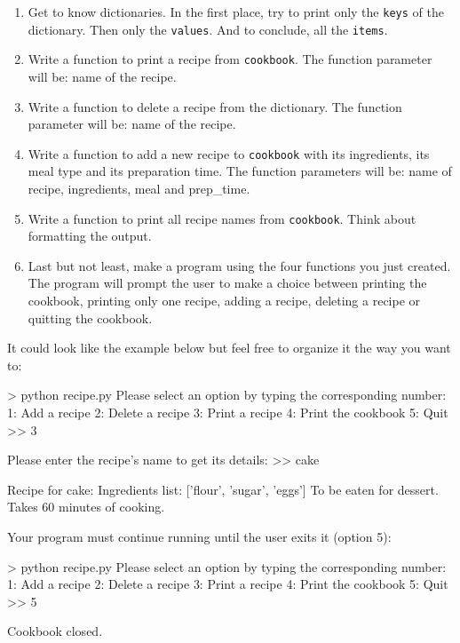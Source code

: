 \documentclass[]{article}
\newenvironment{Shaded}{\begin{snugshade}}{\end{snugshade}}
\newcommand{\NormalTok}[1]{\textcolor[rgb]{0.81,0.81,0.76}{#1}}
\begin{document}
\begin{enumerate}
\def\labelenumi{\arabic{enumi}.}
\item
  Get to know dictionaries. In the first place, try to print only the
  \texttt{keys} of the dictionary. Then only the \texttt{values}. And to
  conclude, all the \texttt{items}.
\item
  Write a function to print a recipe from \texttt{cookbook}. The
  function parameter will be: name of the recipe.
\item
  Write a function to delete a recipe from the dictionary. The function
  parameter will be: name of the recipe.
\item
  Write a function to add a new recipe to \texttt{cookbook} with its
  ingredients, its meal type and its preparation time. The function
  parameters will be: name of recipe, ingredients, meal and prep\_time.
\item
  Write a function to print all recipe names from \texttt{cookbook}.
  Think about formatting the output.
\item
  Last but not least, make a program using the four functions you just
  created. The program will prompt the user to make a choice between
  printing the cookbook, printing only one recipe, adding a recipe,
  deleting a recipe or quitting the cookbook.
\end{enumerate}

It could look like the example below but feel free to organize it the
way you want to:

\begin{Shaded}
\begin{Highlighting}[]
\NormalTok{> python recipe.py}
\NormalTok{Please select an option by typing the corresponding number:}
\NormalTok{1: Add a recipe}
\NormalTok{2: Delete a recipe}
\NormalTok{3: Print a recipe}
\NormalTok{4: Print the cookbook}
\NormalTok{5: Quit}
\NormalTok{>> 3}

\NormalTok{Please enter the recipe's name to get its details:}
\NormalTok{>> cake}

\NormalTok{Recipe for cake:}
\NormalTok{Ingredients list: ['flour', 'sugar', 'eggs']}
\NormalTok{To be eaten for dessert.}
\NormalTok{Takes 60 minutes of cooking.}
\end{Highlighting}
\end{Shaded}

Your program must continue running until the user exits it (option 5):

\begin{Shaded}
\begin{Highlighting}[]
\NormalTok{> python recipe.py}
\NormalTok{Please select an option by typing the corresponding number:}
\NormalTok{1: Add a recipe}
\NormalTok{2: Delete a recipe}
\NormalTok{3: Print a recipe}
\NormalTok{4: Print the cookbook}
\NormalTok{5: Quit}
\NormalTok{>> 5}

\NormalTok{Cookbook closed.}
\end{Highlighting}
\end{Shaded}
\end{document}
